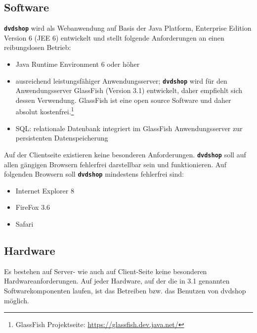 \documentclass[12pt,oneside,a4paper,bibtotoc,liststotoc,pointlessnumbers]{scrartcl}
\begin{document}
\subsection{Software}
\texttt{\textbf{dvdshop}} wird als Webanwendung auf Basis der Java Platform, Enterprise Edition Version 6 (JEE 6) entwickelt und stellt folgende Anforderungen an einen reibungslosen Betrieb:
\begin{itemize}
\item Java Runtime Environment 6 oder höher
\item ausreichend leistungsfähiger Anwendungsserver; \texttt{\textbf{dvdshop}} wird für den Anwendungsserver GlassFish (Version 3.1) entwickelt, daher empfiehlt sich dessen Verwendung. GlassFish ist eine open source Software und daher absolut kostenfrei.\footnote{GlassFish Projektseite: \url{https://glassfish.dev.java.net/}}
\item SQL: relationale Datenbank integriert im GlassFish Anwendungsserver zur persistenten Datenspeicherung
\end{itemize}
Auf der Clientseite existieren keine besonderen Anforderungen. \texttt{\textbf{dvdshop}} soll auf allen gängigen Browsern fehlerfrei darstellbar sein und funktionieren. Auf folgenden Browsern soll \texttt{\textbf{dvdshop}} mindestens fehlerfrei sind:
\begin{itemize}
\item Internet Explorer 8
\item FireFox 3.6
\item Safari
\end{itemize}
\subsection{Hardware}
Es bestehen auf Server- wie auch auf Client-Seite keine besonderen Hardwareanforderungen. Auf jeder Hardware, auf der die in 3.1 genannten Softwarekomponenten laufen, ist das Betreiben bzw. das Benutzen von dvdshop möglich.
\end{document}
